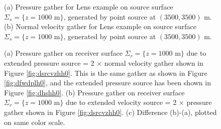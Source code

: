 \documentclass[georeport,12pt]{geophysics}
\begin{document}
\begin{figure}
  \centering
  \caption{(a) Pressure gather for Lens example on source surface
    $\Sigma_s=\{z=1000\mbox{ m}\}$, generated by point source at
    $(3500,3500)$ m. (b) Normal velocity gather for Lens example on source surface
    $\Sigma_s=\{z=1000\mbox{ m}\}$, generated by point source at
    $(3500,3500)$ m.}
\end{figure}

\begin{figure}
  \centering
  \caption{(a) Pressure gather on receiver surface
    $\Sigma_r=\{z=1000\mbox{ m}\}$ due to extended pressure source = 2
    $\times$ normal velocity gather shown in Figure
    \ref{fig:dsrcvzhh0}. This is the same gather as shown in Figure
    \ref{fig:dfwdplh0}, and the extended pressure source has been
    shown in Figure \ref{fig:dhshh0}.
    (b) Pressure gather on receiver surface
    $\Sigma_r=\{z=1000\mbox{ m}\}$ due to extended velocity source = 2
    $\times$ pressure gather shown in Figure
    \ref{fig:dsrcvzhh0}. (c) Difference (b)-(a), plotted on same color
    scale.}
\end{figure}
\end{document}
